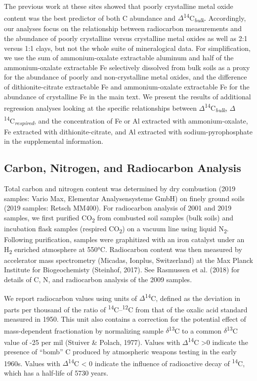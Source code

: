\documentclass[english,man,floatsintext]{apa6}
\begin{document}
The previous work at these sites showed that poorly crystalline metal oxide content was the best predictor of both C abundance and \(\Delta\)\textsuperscript{14}C\textsubscript{\emph{bulk}}. Accordingly, our analyses focus on the relationship between radiocarbon measurements and the abundance of poorly crystalline versus crystalline metal oxides as well as 2:1 versus 1:1 clays, but not the whole suite of mineralogical data. For simplification, we use the sum of ammonium-oxalate extractable aluminum and half of the ammonium-oxalate extractable Fe selectively dissolved from bulk soils as a proxy for the abundance of poorly and non-crystalline metal oxides, and the difference of dithionite-citrate extractable Fe and ammonium-oxalate extractable Fe for the abundance of crystalline Fe in the main text. We present the results of additional regression analyses looking at the specific relationships between \(\Delta\)\textsuperscript{14}C\textsubscript{\emph{bulk}}, \(\Delta\)\textsuperscript{14}C\textsubscript{\emph{respired}}, and the concentration of Fe or Al extracted with ammonium-oxalate, Fe extracted with dithionite-citrate, and Al extracted with sodium-pyrophosphate in the supplemental information.

\hypertarget{carbon-nitrogen-and-radiocarbon-analysis}{%
\subsection{Carbon, Nitrogen, and Radiocarbon Analysis}\label{carbon-nitrogen-and-radiocarbon-analysis}}

Total carbon and nitrogen content was determined by dry combustion (2019 samples: Vario Max, Elementar Analysensysteme GmbH) on finely ground soils (2019 samples: Retsch MM400). For radiocarbon analysis of 2001 and 2019 samples, we first purified CO\textsubscript{2} from combusted soil samples (bulk soils) and incubation flask samples (respired CO\textsubscript{2}) on a vacuum line using liquid N\textsubscript{2}. Following purification, samples were graphitized with an iron catalyst under an H\textsubscript{2} enriched atmosphere at 550°C. Radiocarbon content was then measured by accelerator mass spectrometry (Micadas, Ionplus, Switzerland) at the Max Planck Institute for Biogeochemisty (Steinhof, 2017). See Rasmussen et al. (2018) for details of C, N, and radiocarbon analysis of the 2009 samples.

We report radiocarbon values using units of \(\Delta\)\textsuperscript{14}C, defined as the deviation in parts per thousand of the ratio of \textsuperscript{14}C--\textsuperscript{12}C from that of the oxalic acid standard measured in 1950. This unit also contains a correction for the potential effect of mass-dependent fractionation by normalizing sample \(\delta\)\textsuperscript{13}C to a common \(\delta\)\textsuperscript{13}C value of -25 per mil (Stuiver \& Polach, 1977). Values with \(\Delta\)\textsuperscript{14}C \textgreater{}0 indicate the presence of \enquote{bomb} C produced by atmospheric weapons testing in the early 1960s. Values with \(\Delta\)\textsuperscript{14}C \textless{} 0 indicate the influence of radioactive decay of \textsuperscript{14}C, which has a half-life of 5730 years.
\end{document}
